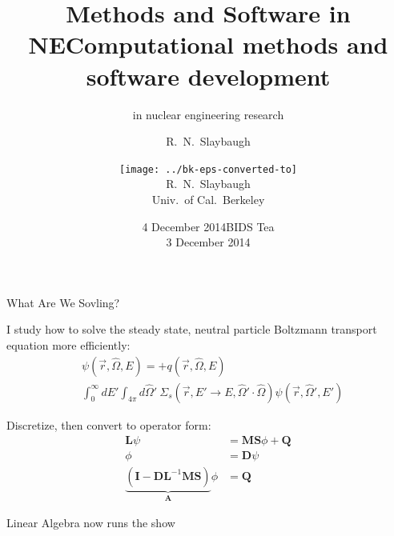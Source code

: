 \documentclass[xcolor=x11names,compress]{beamer}
\title{Methods and Software in NE}
\author{R.\ N.\ Slaybaugh}
\date{4 December 2014}
\renewcommand{\(}{\begin{columns}}
\renewcommand{\)}{\end{columns}}
\newcommand{\<}[1]{\begin{column}{#1}}
\renewcommand{\>}{\end{column}}
\newcommand{\Macro}{\ensuremath{\Sigma}}
\newcommand{\vOmega}{\ensuremath{\hat{\Omega}}}
\newcommand{\ve}[1]{\ensuremath{\mathbf{#1}}}
\begin{document}
\begin{frame}
\title{Computational methods and software development }
\subtitle{in nuclear engineering research}
\author{
        \texttt{[image: ../bk-eps-converted-to]}\\R.\ N.\ Slaybaugh \\ Univ.\ of Cal.\ Berkeley}

\date{BIDS Tea \\ 3 December 2014}
\titlepage
\end{frame}

\begin{frame}{What Are We Sovling?}

    I study how to solve the steady state, neutral particle Boltzmann transport equation
    more efficiently:
    \begin{align}
    [\vOmega \cdot \nabla + \Macro(\vec{r}, E)] &\psi(\vec{r}, \vOmega, E)  =  + q(\vec{r}, \vOmega, E) \nonumber\\
     &\int_0^{\infty} dE' \int_{4\pi} d\vOmega' \:\Macro_{s}(\vec{r}, E' \to E,
     \vOmega' \cdot \vOmega) \psi(\vec{r}, \vOmega', E') \nonumber
    \end{align}

    Discretize, then convert to operator form:
    \begin{align}
    \mathbf{L} \psi &= \mathbf{MS}\phi + \mathbf{Q} \nonumber\\
    \phi &= \mathbf{D}\psi \nonumber \\
    \underbrace{(\ve{I} - \ve{DL}^{-1}\ve{MS})}_{\mathbf{A}}\phi &= \mathbf{Q}\nonumber
    \end{align}
    
    \textcolor{dgreen}{Linear Algebra} now runs the show
    
\end{frame}
\end{document}
